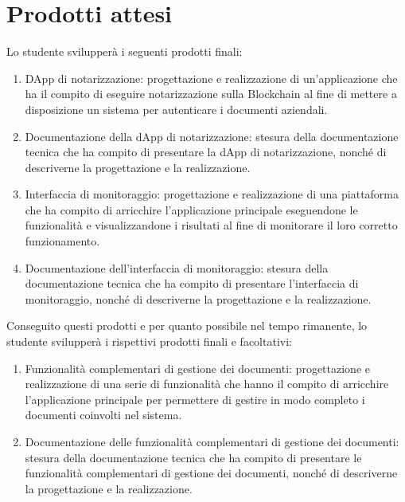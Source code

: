 \section*{Prodotti attesi}
Lo studente svilupperà i seguenti prodotti finali:
\begin{enumerate}
    \item DApp di notarizzazione: progettazione e realizzazione di un'applicazione che ha il compito di eseguire notarizzazione sulla Blockchain al fine di mettere a disposizione un sistema per autenticare i documenti aziendali. 
    
    \item Documentazione della dApp di notarizzazione: stesura della documentazione tecnica che ha compito di presentare la dApp di notarizzazione, nonché di descriverne la progettazione e la realizzazione.

    \item Interfaccia di monitoraggio: progettazione e realizzazione di una piattaforma che ha compito di arricchire l'applicazione principale eseguendone le funzionalità e visualizzandone i risultati al fine di monitorare il loro corretto funzionamento.
    
    \item Documentazione dell'interfaccia di monitoraggio: stesura della documentazione tecnica che ha compito di presentare l'interfaccia di monitoraggio, nonché di descriverne la progettazione e la realizzazione.
\end{enumerate}

Conseguito questi prodotti e per quanto possibile nel tempo rimanente, lo studente svilupperà i rispettivi prodotti finali e facoltativi:

\newpage

\begin{enumerate}
    \item Funzionalità complementari di gestione dei documenti: progettazione e realizzazione di una serie di funzionalità che hanno il compito di arricchire l'applicazione principale per permettere di gestire in modo completo i documenti coinvolti nel sistema.
    
    \item Documentazione delle funzionalità complementari di gestione dei documenti: stesura della documentazione tecnica che ha compito di presentare le funzionalità complementari di gestione dei documenti, nonché di descriverne la progettazione e la realizzazione.
\end{enumerate}